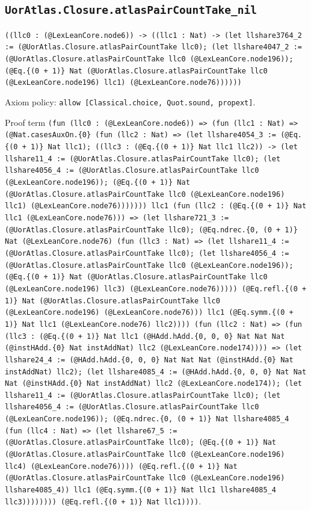 \documentclass[11pt]{article}
\begin{document}
\subsection*{\texttt{UorAtlas.Closure.atlasPairCountTake\_nil}}
\noindent\texttt{((llc0 : (@LexLeanCore.node6)) -> ((llc1 : Nat) -> (let llshare3764\_2 := (@UorAtlas.Closure.atlasPairCountTake llc0); (let llshare4047\_2 := (@UorAtlas.Closure.atlasPairCountTake llc0 (@LexLeanCore.node196)); (@Eq.\{(0 + 1)\} Nat (@UorAtlas.Closure.atlasPairCountTake llc0 (@LexLeanCore.node196) llc1) (@LexLeanCore.node76))))))}\par
\noindent Axiom policy: \texttt{allow [Classical.choice, Quot.sound, propext]}.\par
\noindent Proof term \texttt{(fun (llc0 : (@LexLeanCore.node6)) => (fun (llc1 : Nat) => (@Nat.casesAuxOn.\{0\} (fun (llc2 : Nat) => (let llshare4054\_3 := (@Eq.\{(0 + 1)\} Nat llc1); ((llc3 : (@Eq.\{(0 + 1)\} Nat llc1 llc2)) -> (let llshare11\_4 := (@UorAtlas.Closure.atlasPairCountTake llc0); (let llshare4056\_4 := (@UorAtlas.Closure.atlasPairCountTake llc0 (@LexLeanCore.node196)); (@Eq.\{(0 + 1)\} Nat (@UorAtlas.Closure.atlasPairCountTake llc0 (@LexLeanCore.node196) llc1) (@LexLeanCore.node76))))))) llc1 (fun (llc2 : (@Eq.\{(0 + 1)\} Nat llc1 (@LexLeanCore.node76))) => (let llshare721\_3 := (@UorAtlas.Closure.atlasPairCountTake llc0); (@Eq.ndrec.\{0, (0 + 1)\} Nat (@LexLeanCore.node76) (fun (llc3 : Nat) => (let llshare11\_4 := (@UorAtlas.Closure.atlasPairCountTake llc0); (let llshare4056\_4 := (@UorAtlas.Closure.atlasPairCountTake llc0 (@LexLeanCore.node196)); (@Eq.\{(0 + 1)\} Nat (@UorAtlas.Closure.atlasPairCountTake llc0 (@LexLeanCore.node196) llc3) (@LexLeanCore.node76))))) (@Eq.refl.\{(0 + 1)\} Nat (@UorAtlas.Closure.atlasPairCountTake llc0 (@LexLeanCore.node196) (@LexLeanCore.node76))) llc1 (@Eq.symm.\{(0 + 1)\} Nat llc1 (@LexLeanCore.node76) llc2)))) (fun (llc2 : Nat) => (fun (llc3 : (@Eq.\{(0 + 1)\} Nat llc1 (@HAdd.hAdd.\{0, 0, 0\} Nat Nat Nat (@instHAdd.\{0\} Nat instAddNat) llc2 (@LexLeanCore.node174)))) => (let llshare24\_4 := (@HAdd.hAdd.\{0, 0, 0\} Nat Nat Nat (@instHAdd.\{0\} Nat instAddNat) llc2); (let llshare4085\_4 := (@HAdd.hAdd.\{0, 0, 0\} Nat Nat Nat (@instHAdd.\{0\} Nat instAddNat) llc2 (@LexLeanCore.node174)); (let llshare11\_4 := (@UorAtlas.Closure.atlasPairCountTake llc0); (let llshare4056\_4 := (@UorAtlas.Closure.atlasPairCountTake llc0 (@LexLeanCore.node196)); (@Eq.ndrec.\{0, (0 + 1)\} Nat llshare4085\_4 (fun (llc4 : Nat) => (let llshare67\_5 := (@UorAtlas.Closure.atlasPairCountTake llc0); (@Eq.\{(0 + 1)\} Nat (@UorAtlas.Closure.atlasPairCountTake llc0 (@LexLeanCore.node196) llc4) (@LexLeanCore.node76)))) (@Eq.refl.\{(0 + 1)\} Nat (@UorAtlas.Closure.atlasPairCountTake llc0 (@LexLeanCore.node196) llshare4085\_4)) llc1 (@Eq.symm.\{(0 + 1)\} Nat llc1 llshare4085\_4 llc3)))))))) (@Eq.refl.\{(0 + 1)\} Nat llc1))))}.\par
\end{document}
